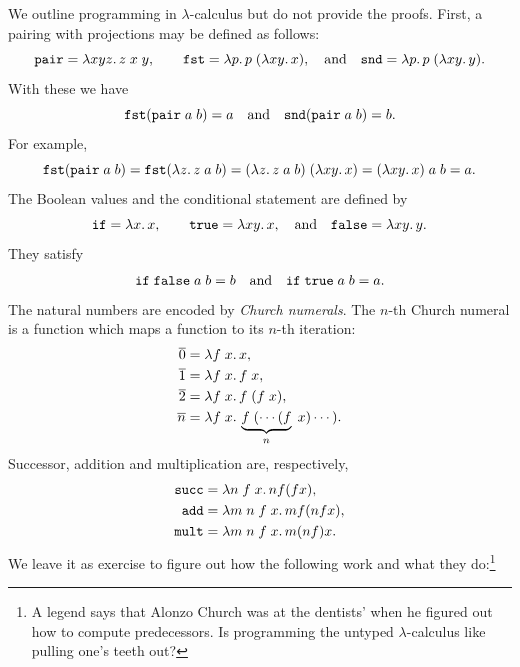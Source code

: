 We outline programming in $\lambda$-calculus but do not provide the
proofs. First, a pairing with projections may be defined as follows:
%
\begin{equation*}
  \mathtt{pair} = \lambda x y z .\,z\; x\; y,
  \qquad
  \mathtt{fst} = \lambda p .\,p \; (\lambda x y .\,x),
  \quad\text{and}\quad
  \mathtt{snd} = \lambda p .\,p \; (\lambda x y .\,y).
\end{equation*}
%
With these we have
%
\begin{equation*}
  \mathtt{fst} (\mathtt{pair}\; a\; b) = a
  \quad\text{and}\quad
  \mathtt{snd} (\mathtt{pair}\; a\; b) = b.
\end{equation*}
%
For example,
%
\begin{equation*}
  \mathtt{fst} (\mathtt{pair}\; a\; b) =
  \mathtt{fst} (\lambda z .\,z\; a\; b) =
  (\lambda z .\,z\; a\; b) \; (\lambda x y .\,x) =
  (\lambda x y .\,x) \; a \; b = a.
\end{equation*}
%
The Boolean values and the conditional statement are defined by
%
\begin{equation*}
  \mathtt{if} = \lambda x .\,x,
  \qquad
  \mathtt{true} = \lambda x y .\,x,
  \quad\text{and}\quad
  \mathtt{false} = \lambda x y .\,y.
\end{equation*}
%
They satisfy
%
\begin{equation*}
  \mathtt{if}\;\mathtt{false}\;a\;b = b
  \quad\text{and}\quad
  \mathtt{if}\;\mathtt{true}\;a\;b = a.
\end{equation*}
%
The natural numbers are encoded by \emph{Church numerals}. The $n$-th
Church numeral is a function which maps a function to its $n$-th
iteration:
%
\begin{align*}
  \overline{0} &= \lambda f\;x .\,x,\\
  \overline{1} &= \lambda f\;x .\,f\;x,\\
  \overline{2} &= \lambda f\;x .\,f\;(f\;x),\\
  \overline{n} &= \lambda f\;x .\,\underbrace{f\;(\cdots (f}_n\;x) \cdots).
\end{align*}
%
Successor, addition and multiplication are, respectively,
%
\begin{align*}
  \mathtt{succ} &= \lambda n\;f\;x .\,n f (f x),\\
  \mathtt{add} &= \lambda m\;n\;f\;x .\,m f (n f x),\\
  \mathtt{mult} &= \lambda m\;n\;f\;x .\,m (n f) x.
\end{align*}
%
We leave it as exercise to figure out how the following work and what
they do:\footnote{A legend says that Alonzo Church was at the
  dentists' when he figured out how to compute predecessors. Is
  programming the untyped $\lambda$-calculus like pulling one's teeth
  out?}
